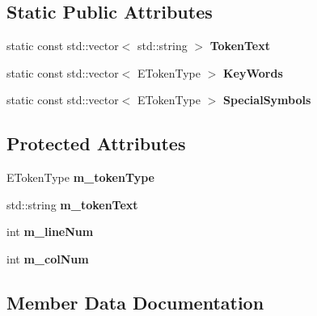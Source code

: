 \subsection*{Static Public Attributes}
\begin{DoxyCompactItemize}
\item 
static const std\+::vector$<$ std\+::string $>$ {\bfseries Token\+Text}
\item 
static const std\+::vector$<$ E\+Token\+Type $>$ {\bfseries Key\+Words}
\item 
static const std\+::vector$<$ E\+Token\+Type $>$ {\bfseries Special\+Symbols}
\end{DoxyCompactItemize}
\subsection*{Protected Attributes}
\begin{DoxyCompactItemize}
\item 
E\+Token\+Type {\bfseries m\+\_\+token\+Type}\hypertarget{class_scanner_1_1_token_afdb4cd3121e353221f190997dd20648f}{}\label{class_scanner_1_1_token_afdb4cd3121e353221f190997dd20648f}

\item 
std\+::string {\bfseries m\+\_\+token\+Text}\hypertarget{class_scanner_1_1_token_a03cda26b93d4751fe631c65912e6d446}{}\label{class_scanner_1_1_token_a03cda26b93d4751fe631c65912e6d446}

\item 
int {\bfseries m\+\_\+line\+Num}\hypertarget{class_scanner_1_1_token_a00d8f8fc6715651a1a02e11579ce099f}{}\label{class_scanner_1_1_token_a00d8f8fc6715651a1a02e11579ce099f}

\item 
int {\bfseries m\+\_\+col\+Num}\hypertarget{class_scanner_1_1_token_a34c62ba179be0a9881fe5fb0c38f89b1}{}\label{class_scanner_1_1_token_a34c62ba179be0a9881fe5fb0c38f89b1}

\end{DoxyCompactItemize}


\subsection{Member Data Documentation}
